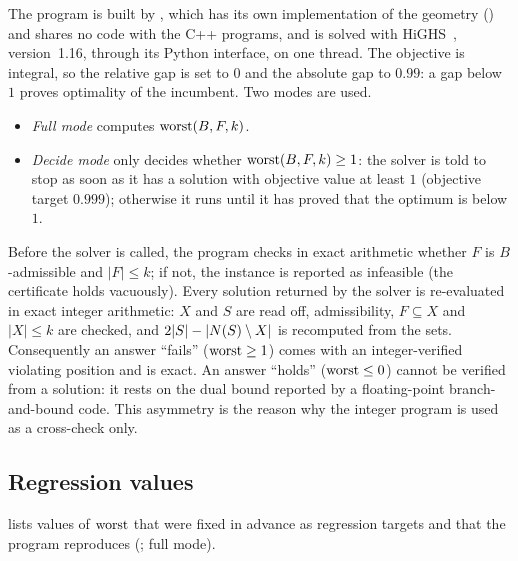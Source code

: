 The program is built by , which has its own implementation of the geometry
() and shares no code with the C++ programs, and is solved with HiGHS~\cite{HuangfuHall2018},
version~1.16, through its Python interface, on one thread. The objective is integral, so the relative gap
is set to $0$ and the absolute gap to $0.99$: a gap below $1$ proves optimality of the incumbent. Two
modes are used.
\begin{itemize}[leftmargin=1.6em]
\item \emph{Full mode} computes $\operatorname{worst}(B,F,k)$.
\item \emph{Decide mode} only decides whether $\operatorname{worst}(B,F,k)\ge1$: the solver is told to stop as soon as it
  has a solution with objective value at least $1$ (objective target $0.999$); otherwise it runs until it
  has proved that the optimum is below $1$.
\end{itemize}
Before the solver is called, the program checks in exact arithmetic whether $F$ is $B$-admissible and
$|F|\le k$; if not, the instance is reported as infeasible (the certificate holds vacuously). Every
solution returned by the solver is re-evaluated in exact integer arithmetic: $X$ and $S$ are read off,
admissibility, $F\subseteq X$ and $|X|\le k$ are checked, and $2|S|-|N(S)\setminus X|$ is recomputed from the
sets. Consequently an answer ``fails'' ($\operatorname{worst}\ge1$) comes with an integer-verified violating position and
is exact. An answer ``holds'' ($\operatorname{worst}\le0$) cannot be verified from a solution: it rests on the dual bound
reported by a floating-point branch-and-bound code. This asymmetry is the reason why the integer program
is used as a cross-check only.

\subsection{Regression values}\label{ssec:ip-regression}

 lists values of $\operatorname{worst}$ that were fixed in advance as regression targets and
that the program reproduces (; full mode).

